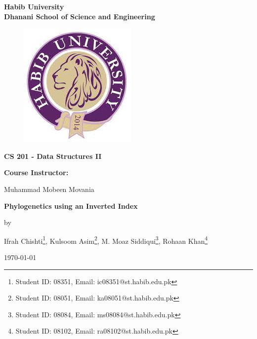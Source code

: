 \documentclass[a4paper,20pt,titlepage]{article}
\begin{document}
\begin{titlepage}
   \begin{center}
   
        \huge
       \textbf{Habib University} \\
       \textbf{Dhanani School of Science and Engineering} \\
       
        \begin{figure}[H]
           \centering
           \includegraphics[scale = 0.75]{HU logo.jpg}
           \label{fig:my_label}
       \end{figure}

        \vspace{0.5cm}

         \textbf{CS 201 - Data Structures II}
         \vspace{0.5cm}

         \LARGE
         \textbf{Course Instructor:}
         
         \Large
         Muhammad Mobeen Movania	

        \vspace{1cm}
        \huge
        \textbf{Phylogenetics using an Inverted Index}
        
      \vspace{1cm}
      \Large
      by       
      \vspace{1cm}
      
      \Large{Ifrah Chishti\footnote{Student ID: 08351, Email: ic08351@st.habib.edu.pk}, Kulsoom Asim\footnote{Student ID: 08051, Email: ka08051@st.habib.edu.pk}, M. Moaz Siddiqui\footnote{Student ID: 08084, Email: ms08084@st.habib.edu.pk}, Rohaan Khan\footnote{Student ID: 08102, Email: ra08102@st.habib.edu.pk}}
      \vspace{1cm}
      
      \today \\
      
   \end{center}
\end{titlepage}
\cfoot{\thepage}
\tableofcontents
\newpage
\end{document}
